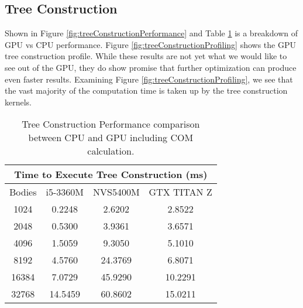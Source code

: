 \documentclass{thesis}
\begin{document}
\subsection{Tree Construction}
Shown in Figure \ref{fig:treeConstructionPerformance} and Table \ref{tab:treeConstructionPerformance} is a breakdown of GPU vs CPU performance. Figure \ref{fig:treeConstructionProfiling} shows the GPU tree construction profile. While these results are not yet what we would like to see out of the GPU, they do show promise that further optimization can produce even faster results. Examining Figure \ref{fig:treeConstructionProfiling}, we see that the vast majority of the computation time is taken up by the tree construction kernels.
\begin{table}
    \centering
    \caption{Tree Construction Performance comparison between CPU and GPU including COM calculation.}
    \label{tab:treeConstructionPerformance}
    \begin{tabular}{|c|||c||c|c|}
        \hline
        \multicolumn{4}{|c|}{Time to Execute Tree Construction (ms)}\\
        \hline
        Bodies & i5-3360M & NVS5400M & GTX TITAN Z \\
        \hline
        1024 & 0.2248 & 2.6202 & 2.8522\\
        2048 & 0.5300 & 3.9361 & 3.6571\\
        4096 & 1.5059 & 9.3050 & 5.1010\\
        8192 & 4.5760 & 24.3769 & 6.8071\\
        16384 & 7.0729 & 45.9290 & 10.2291\\
        32768 & 14.5459 & 60.8602 & 15.0211\\
        \hline
    \end{tabular}
\end{table}
\end{document}
